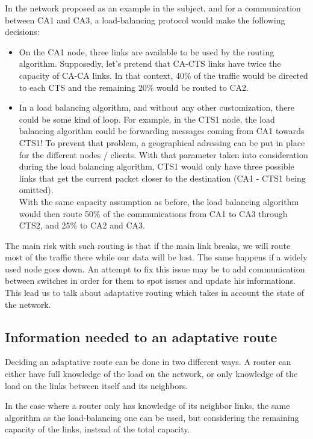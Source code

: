 \documentclass[lettersize,journal]{IEEEtran} %
\begin{document}
In the network proposed as an example in the subject, and for a communication between CA1 and CA3,
a load-balancing protocol would make the following decisions:
\begin{itemize}
        \item On the CA1 node, three links are available to be used by the routing algorithm.
        Supposedly, let's pretend that CA-CTS links have twice the capacity of CA-CA links.
        In that context, 40\% of the traffic would be directed to each CTS and the remaining 20\% 
        would be routed to CA2.
        \item In a load balancing algorithm, and without any other customization, there could be 
        some kind of loop. For example, in the CTS1 node, the load balancing algorithm could be
        forwarding messages coming from CA1 towards CTS1! To prevent that problem, a geographical
        adressing can be put in place for the different nodes / clients. With that parameter taken
        into consideration during the load balancing algorithm, CTS1 would only have three possible
        links that get the current packet closer to the destination (CA1 - CTS1 being omitted).\\
        With the same capacity assumption as before, the load balancing algorithm would then route
        50\% of the communications from CA1 to CA3 through CTS2, and 25\% to CA2 and CA3.       
\end{itemize} 

The main risk with such routing is that if the main link breaks, we will route most of the
traffic there while our data will be lost. The same happens if a widely used node goes down.
An attempt to fix this issue may be to add communication between switches in order for them
to spot issues and update his informations. This lead us to talk about adaptative routing
which takes in account the state of the network.

\subsection{Information needed to an adaptative route}
Deciding an adaptative route can be done in two different ways.
A router can either have full knowledge of the load on the network, 
or only knowledge of the load on the links between itself and its neighbors.

In the case where a router only has knowledge of its neighbor links, 
the same algorithm as the load-balancing one can be used, but considering 
the remaining capacity of the links, instead of the total capacity.
\end{document}
